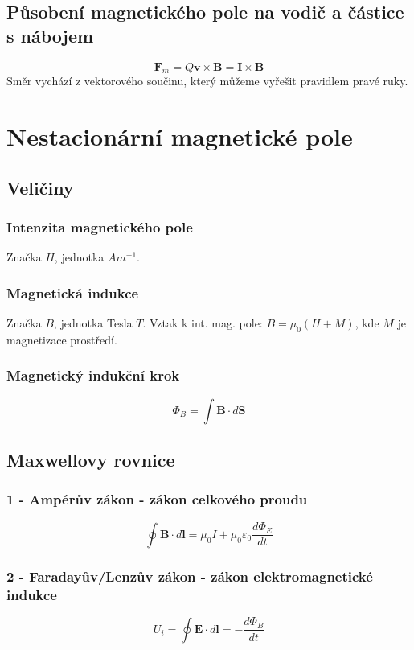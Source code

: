 \documentclass[titlepage]{report}
\begin{document}
\section{Působení magnetického pole na vodič a částice s nábojem}
\begin{equation}
\boldsymbol F_m = Q\boldsymbol v \times \boldsymbol B = \boldsymbol I \times \boldsymbol B
\end{equation}
Směr vychází z vektorového součinu, který můžeme vyřešit pravidlem pravé ruky.
\chapter{Nestacionární magnetické pole}
\section{Veličiny}
\subsection{Intenzita magnetického pole}
Značka $H$, jednotka $Am^{-1}$.
\subsection{Magnetická indukce}
Značka $B$, jednotka Tesla $T$. Vztak k int. mag. pole: $B = \mu_0(H + M)$, kde $M$ je magnetizace prostředí.
\subsection{Magnetický indukční krok}
\begin{equation}
\Phi_B = \int \boldsymbol B \cdot d \boldsymbol S
\end{equation}
\section{Maxwellovy rovnice}
\subsection{1 - Ampérův zákon - zákon celkového proudu}
\begin{equation}
\oint \boldsymbol B \cdot d \boldsymbol l = \mu_0 I + \mu_0\varepsilon_0 \frac{d\Phi_E}{dt}
\end{equation}
\subsection{2 - Faradayův/Lenzův zákon - zákon elektromagnetické indukce}
\begin{equation}
U_{i} = \oint \boldsymbol E \cdot d \boldsymbol l = - \frac{d\Phi_B}{dt}
\end{equation}
\end{document}
